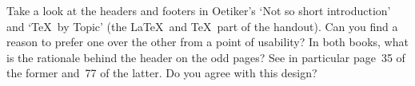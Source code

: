 Take a look at the headers and footers in Oetiker's `Not so short
introduction' and `\TeX\ by Topic' (the \LaTeX\ and \TeX\ part
of the handout). Can you find a reason to prefer one over the other
from a point of usability?
In both books, what is the rationale behind the header on the odd
pages? See in particular page~35 of the former and~77 of the
latter. Do you agree with this design?
